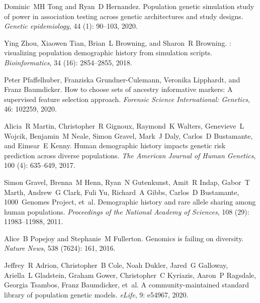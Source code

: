 \documentclass{article}
\begin{document}
\begin{thebibliography}{18}
Dominic~MH Tong and Ryan~D Hernandez.
\newblock Population genetic simulation study of power in association testing
  across genetic architectures and study designs.
\newblock \emph{Genetic epidemiology}, 44 (1): 90--103, 2020.

Ying Zhou, Xiaowen Tian, Brian~L Browning, and Sharon~R Browning.
: visualizing population demographic history from
  simulation scripts.
\newblock \emph{Bioinformatics}, 34 (16): 2854--2855, 2018.

Peter Pfaffelhuber, Franziska Grundner-Culemann, Veronika Lipphardt, and Franz
  Baumdicker.
\newblock How to choose sets of ancestry informative markers: A supervised
  feature selection approach.
\newblock \emph{Forensic Science International: Genetics}, 46: 102259,
  2020.

Alicia~R Martin, Christopher~R Gignoux, Raymond~K Walters, Genevieve~L Wojcik,
  Benjamin~M Neale, Simon Gravel, Mark~J Daly, Carlos~D Bustamante, and
  Eimear~E Kenny.
\newblock Human demographic history impacts genetic risk prediction across
  diverse populations.
\newblock \emph{The American Journal of Human Genetics}, 100
  (4): 635--649, 2017.

Simon Gravel, Brenna~M Henn, Ryan~N Gutenkunst, Amit~R Indap, Gabor~T Marth,
  Andrew~G Clark, Fuli Yu, Richard~A Gibbs, Carlos~D Bustamante, 1000~Genomes
  Project, et~al.
\newblock Demographic history and rare allele sharing among human populations.
\newblock \emph{Proceedings of the National Academy of Sciences}, 108
  (29): 11983--11988, 2011.

Alice~B Popejoy and Stephanie~M Fullerton.
\newblock Genomics is failing on diversity.
\newblock \emph{Nature News}, 538 (7624): 161, 2016.

Jeffrey~R Adrion, Christopher~B Cole, Noah Dukler, Jared~G Galloway, Ariella~L
  Gladstein, Graham Gower, Christopher~C Kyriazis, Aaron~P Ragsdale, Georgia
  Tsambos, Franz Baumdicker, et~al.
\newblock A community-maintained standard library of population genetic models.
\newblock \emph{eLife}, 9: e54967, 2020.


\end{thebibliography}
\end{document}
